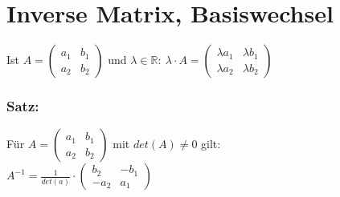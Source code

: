 \section{Inverse Matrix, Basiswechsel}
Ist $A=\begin{pmatrix}a_{1} & b_{1} \\ a_{2} & b_{2} \end{pmatrix}$ und $\lambda \in \mathbb{R}: \ \lambda \cdot A = \begin{pmatrix} \lambda a_{1} & \lambda b_{1} \\ \lambda a_{2} & \lambda b_{2} \end{pmatrix}$\\
%
%
%
\subsubsection{Satz:}
Für $A=\begin{pmatrix}a_{1} & b_{1} \\ a_{2} & b_{2} \end{pmatrix}$ mit $det(A) \neq 0$ gilt:\\
$A^{-1} = \frac{1}{det(a)} \cdot \begin{pmatrix} b_{2} & -b_{1} \\ -a_{2} & a_{1} \end{pmatrix}$
%
%
%
